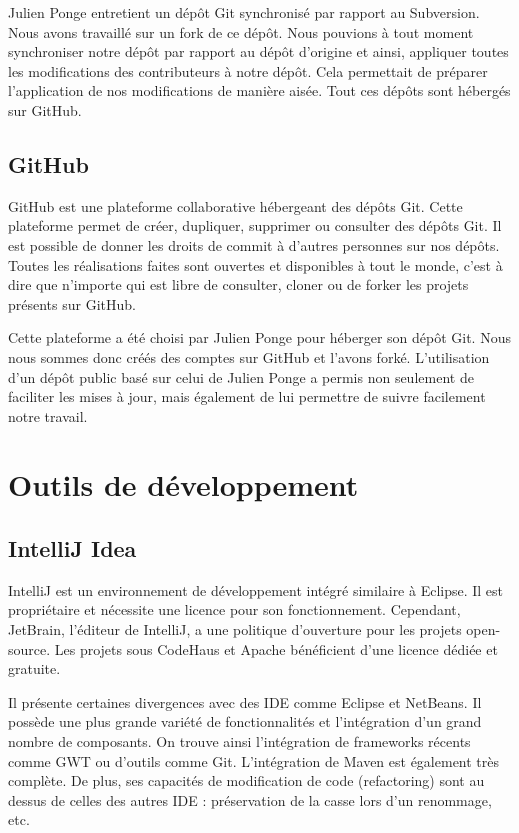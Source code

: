 Julien Ponge entretient un dépôt Git synchronisé par rapport au Subversion. Nous avons travaillé sur un fork de ce dépôt.
Nous pouvions à tout moment synchroniser notre dépôt par rapport au dépôt d'origine et ainsi, appliquer toutes les modifications des contributeurs à notre dépôt.
Cela permettait de préparer l'application de nos modifications de manière aisée. Tout ces dépôts sont hébergés sur GitHub.
\subsection{GitHub}
GitHub est une plateforme collaborative hébergeant des dépôts Git. Cette plateforme permet de créer, dupliquer, supprimer ou consulter des dépôts Git.
Il est possible de donner les droits de commit à d'autres personnes sur nos dépôts.
Toutes les réalisations faites sont ouvertes et disponibles à tout le monde, c'est à dire que n'importe qui est libre de consulter, cloner ou de forker les projets présents sur GitHub.

Cette plateforme a été choisi par Julien Ponge pour héberger son dépôt Git. Nous nous sommes donc créés des comptes sur GitHub et l'avons forké. L'utilisation d'un dépôt public basé sur celui de Julien Ponge a permis non seulement de faciliter les mises à jour, mais également de lui permettre de suivre facilement notre travail.




\section{Outils de développement}
\subsection{IntelliJ Idea}
IntelliJ est un environnement de développement intégré similaire à Eclipse.
Il est propriétaire et nécessite une licence pour son fonctionnement. Cependant, JetBrain, l'éditeur de IntelliJ, a une politique d'ouverture pour les projets open-source.
Les projets sous CodeHaus et Apache bénéficient d'une licence dédiée et gratuite. 

Il présente certaines divergences avec des IDE comme Eclipse et NetBeans.
Il possède une plus grande variété de fonctionnalités et l'intégration d'un grand nombre de composants.
On trouve ainsi l'intégration de frameworks récents comme GWT ou d'outils comme Git. L'intégration de Maven est également très complète.
De plus, ses capacités de modification de code (refactoring) sont au dessus de celles des autres IDE : préservation de la casse lors d'un renommage, etc.
